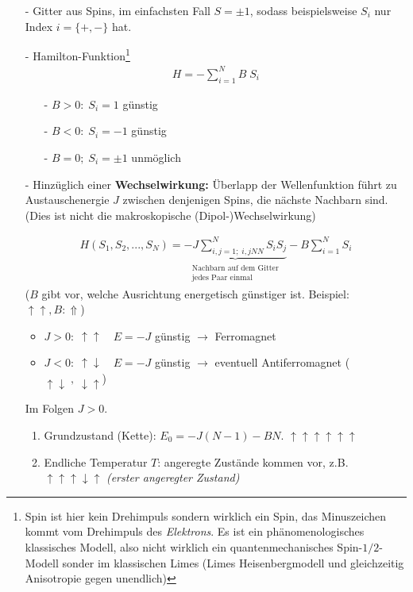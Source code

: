\documentclass[12pt]{article}
\begin{document}
 \begin{itemize}
\item[-] Gitter aus Spins, im einfachsten Fall $S= \pm 1$, sodass beispielsweise $S_i$ nur Index $i= \{+,-\}$ hat.
\item[-]Hamilton-Funktion\footnote{Spin ist hier kein Drehimpuls sondern wirklich ein Spin, das Minuszeichen kommt vom Drehimpuls des \textit{Elektrons}. Es ist ein phänomenologisches klassisches Modell, also nicht wirklich ein quantenmechanisches Spin-$1/2$-Modell sonder im klassischen Limes (Limes Heisenbergmodell und gleichzeitig Anisotropie gegen unendlich)}
\begin{align}
H= - \sum_{i=1}^N B \; S_i
\end{align}
\begin{itemize}
\item[-] $B> 0 : \; S_i = 1$ günstig 
\item[-]  $B<0 : \; S_i = -1$ günstig 
\item[-] $B=0; \; S_i = \pm 1$ unmöglich
\end{itemize}
 \item[-]Hinzüglich einer \textbf{Wechselwirkung:} Überlapp der Wellenfunktion führt zu Austauschenergie $J$ zwischen denjenigen Spins, die nächste Nachbarn sind. (Dies ist nicht die makroskopische (Dipol-)Wechselwirkung) 
 
 \begin{align}
  H(S_1, S_2, ..., S_N) = \underbrace{ -J \sum_{i,j=1;\; i,j NN}^N S_i S_j }_{\substack{\text{Nachbarn auf dem Gitter} \\ \text{jedes Paar einmal}}} - B \sum_{i=1}^N S_i
\end{align}  
($B$ gibt vor, welche Ausrichtung energetisch günstiger ist. Beispiel: $\uparrow \uparrow, B: \Uparrow$)
  \begin{itemize}
  \item $J>0: \; \uparrow \uparrow  \quad E= -J$ günstig $\rightarrow$ Ferromagnet
  \item $J<0: \; \uparrow \downarrow  \quad E= -J$ günstig $\rightarrow$ eventuell Antiferromagnet ($\uparrow \downarrow \; , \; \downarrow \uparrow$)
  \end{itemize}
  Im Folgen $J>0$. 

\begin{enumerate}
\item Grundzustand (Kette): $E_0= -J(N-1)-BN $. $\uparrow \uparrow \uparrow \uparrow \uparrow \uparrow$
\item Endliche Temperatur $T$: angeregte Zustände kommen vor, z.B. $\uparrow \uparrow \uparrow \downarrow \uparrow$ \textit{(erster angeregter Zustand)}
\end{enumerate}


\end{itemize}
\end{document}
